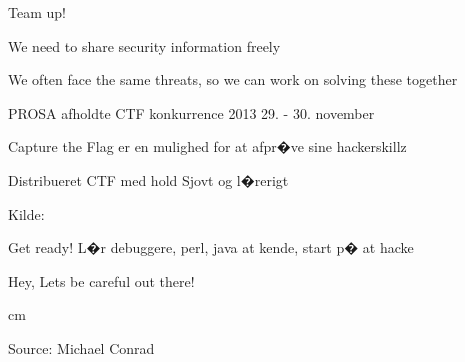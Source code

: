 \documentclass[20pt,landscape,a4paper,footrule]{foils}
\begin{document}


\begin{list1}
\item Team up!
\item We need to share security information freely
\item We often face the same threats, so we can work on solving these together
\end{list1}





\begin{list1}
\item PROSA afholdte CTF konkurrence 2013 29. - 30. november
\item Capture the Flag er en mulighed for at afpr�ve sine hackerskillz
\item Distribueret CTF med hold  Sjovt og l�rerigt
\end{list1}
Kilde: 

\centerline{Get ready! L�r debuggere, perl, java at kende, start p� at hacke}



\centerline{\Large Hey, Lets be careful out there!}
 cm

\begin{center}
\myname

\end{center}

\vskip 2cm
Source: Michael Conrad 
\end{document}
